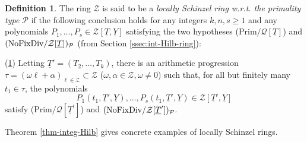 \documentclass[11pt,a4paper,reqno]{amsart}
\theoremstyle{definition}
\newtheorem{defn}[thm]{Definition}
\begin{document}
    
\begin{defn} \label{def:schinzel-ring}
The ring ${\mathcal Z}$ is said to be a \emph{locally Schinzel ring \hbox{w.r.t.} the primality type ${\mathcal P}$}  if the following conclusion holds for any integers $k,n,s \geq 1$ and any polynomials $P_1,\ldots,P_s \in {\mathcal Z}[\underline{T},\underline{Y}]$ satisfying the two hypotheses (Prim$/{\mathcal Q}[\underline T]$) and $\hbox{\rm (NoFixDiv}/{\mathcal Z}[\underline T])_{\mathcal P}$ (from Section \ref{ssec:int-Hilb-ring}):
  \vskip 1mm


\noindent
(\ref{def:schinzel-ring})  \hskip 1mm Letting $\underline{T}'=(T_2,\dots,T_k)$, there is an arithmetic progression $\tau=(\omega \ell + \alpha)_{\ell \in {\mathcal Z}} \subset {\mathcal Z}$ ($\omega,\alpha \in {\mathcal Z},\omega \neq 0$) such that, for all but finitely many
$t_1 \in \tau$, the polynomials
$$
P_1(t_1,\underline{T}',\underline{Y}),\dots,P_s(t_1,\underline{T}',\underline{Y}) \in {\mathcal Z}[\underline{T}',\underline{Y}]
$$
satisfy (Prim$/{\mathcal Q}[\underline T^\prime]$) and $\hbox{\rm (NoFixDiv}/{\mathcal Z}[\underline T^\prime])_{\mathcal P}$.
\end{defn}

Theorem \ref{thm-integ-Hilb} gives concrete examples of locally Schinzel rings. 
\end{document}

